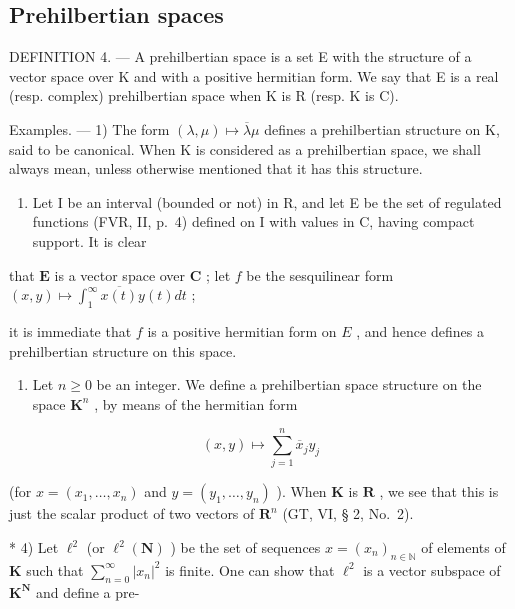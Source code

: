 \subsection{Prehilbertian spaces}

DEFINITION 4. --- A prehilbertian space is a set E with the structure of a vector space over K and with a positive hermitian form. We say that E is a real (resp. complex) prehilbertian space when K is R (resp. K is C).

Examples. --- 1) The form \((\lambda, \mu) \mapsto \overline{\lambda}\mu\) defines a prehilbertian structure on K, said to be canonical. When K is considered as a prehilbertian space, we shall always mean, unless otherwise mentioned that it has this structure.

\begin{enumerate}
\def\labelenumi{\arabic{enumi})}
\setcounter{enumi}{1}
\tightlist
\item
  Let I be an interval (bounded or not) in R, and let E be the set of regulated functions (FVR, II, p.~4) defined on I with values in C, having compact support. It is clear
\end{enumerate}

that \(\mathbf{E}\) is a vector space over \(\mathbf{C}\) ; let \(f\) be the sesquilinear form \((x, y) \mapsto \int_{1}^{\infty} \overline{x(t)} y(t) dt\) ;

it is immediate that \(f\) is a positive hermitian form on \(E\) , and hence defines a prehilbertian structure on this space.

\begin{enumerate}
\def\labelenumi{\arabic{enumi})}
\setcounter{enumi}{2}
\tightlist
\item
  Let \(n \geqslant 0\) be an integer. We define a prehilbertian space structure on the space \(\mathbf{K}^n\) , by means of the hermitian form
\end{enumerate}

\[
(x, y) \mapsto \sum_ {j = 1} ^ {n} \overline {{{{x}}}} _ {j} y _ {j}
\]

(for \(x = (x_{1}, \ldots, x_{n})\) and \(y = (y_{1}, \ldots, y_{n})\) ). When \(\mathbf{K}\) is \(\mathbf{R}\) , we see that this is just the scalar product of two vectors of \(\mathbf{R}^{n}\) (GT, VI, § 2, No.~2).

* 4) Let \(\ell^2\) (or \(\ell^2(\mathbf{N})\) ) be the set of sequences \(x = (x_n)_{n \in \mathbb{N}}\) of elements of \(\mathbf{K}\) such that \(\sum_{n=0}^{\infty} |x_n|^2\) is finite. One can show that \(\ell^2\) is a vector subspace of \(\mathbf{K}^{\mathbf{N}}\) and define a pre-

